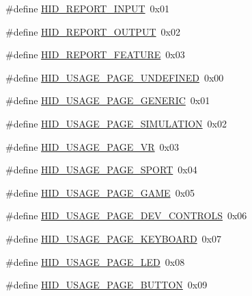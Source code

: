 \begin{DoxyCompactItemize}
\item 
\#define \hyperlink{group__USBD__HID_gae73239f50524749753c8b6e1f11253b9}{H\+I\+D\+\_\+\+R\+E\+P\+O\+R\+T\+\_\+\+I\+N\+P\+UT}~0x01
\item 
\#define \hyperlink{group__USBD__HID_ga63548c31cddad143e8eb163be04357cd}{H\+I\+D\+\_\+\+R\+E\+P\+O\+R\+T\+\_\+\+O\+U\+T\+P\+UT}~0x02
\item 
\#define \hyperlink{group__USBD__HID_ga0914abbc0a279f78b37d567c54f4888e}{H\+I\+D\+\_\+\+R\+E\+P\+O\+R\+T\+\_\+\+F\+E\+A\+T\+U\+RE}~0x03
\end{DoxyCompactItemize}
\begin{DoxyCompactItemize}
\item 
\#define \hyperlink{group__USBD__HID_ga73a32173a51a8d1e21dd14de726593d7}{H\+I\+D\+\_\+\+U\+S\+A\+G\+E\+\_\+\+P\+A\+G\+E\+\_\+\+U\+N\+D\+E\+F\+I\+N\+ED}~0x00
\item 
\#define \hyperlink{group__USBD__HID_ga9c343007cfc4f4836b8a8aec4fded7ee}{H\+I\+D\+\_\+\+U\+S\+A\+G\+E\+\_\+\+P\+A\+G\+E\+\_\+\+G\+E\+N\+E\+R\+IC}~0x01
\item 
\#define \hyperlink{group__USBD__HID_ga2cdc484710c424ebeb438f72f2a2e942}{H\+I\+D\+\_\+\+U\+S\+A\+G\+E\+\_\+\+P\+A\+G\+E\+\_\+\+S\+I\+M\+U\+L\+A\+T\+I\+ON}~0x02
\item 
\#define \hyperlink{group__USBD__HID_ga746db0254ad632c95b768ee09d8c148d}{H\+I\+D\+\_\+\+U\+S\+A\+G\+E\+\_\+\+P\+A\+G\+E\+\_\+\+VR}~0x03
\item 
\#define \hyperlink{group__USBD__HID_ga09fcd4f26f12737654445e388ea5c9ff}{H\+I\+D\+\_\+\+U\+S\+A\+G\+E\+\_\+\+P\+A\+G\+E\+\_\+\+S\+P\+O\+RT}~0x04
\item 
\#define \hyperlink{group__USBD__HID_ga953e215830449d6bc0718279a9ec914c}{H\+I\+D\+\_\+\+U\+S\+A\+G\+E\+\_\+\+P\+A\+G\+E\+\_\+\+G\+A\+ME}~0x05
\item 
\#define \hyperlink{group__USBD__HID_ga41932b4f7dcc0cacd501c6b399bd8332}{H\+I\+D\+\_\+\+U\+S\+A\+G\+E\+\_\+\+P\+A\+G\+E\+\_\+\+D\+E\+V\+\_\+\+C\+O\+N\+T\+R\+O\+LS}~0x06
\item 
\#define \hyperlink{group__USBD__HID_ga9c5606a57164a07d982b30bdfc31a90a}{H\+I\+D\+\_\+\+U\+S\+A\+G\+E\+\_\+\+P\+A\+G\+E\+\_\+\+K\+E\+Y\+B\+O\+A\+RD}~0x07
\item 
\#define \hyperlink{group__USBD__HID_ga4680a92b7f18a236eacc6f07c51befad}{H\+I\+D\+\_\+\+U\+S\+A\+G\+E\+\_\+\+P\+A\+G\+E\+\_\+\+L\+ED}~0x08
\item 
\#define \hyperlink{group__USBD__HID_ga303a1c3920ca7b22c4d1af750897b808}{H\+I\+D\+\_\+\+U\+S\+A\+G\+E\+\_\+\+P\+A\+G\+E\+\_\+\+B\+U\+T\+T\+ON}~0x09

\end{DoxyCompactItemize}
